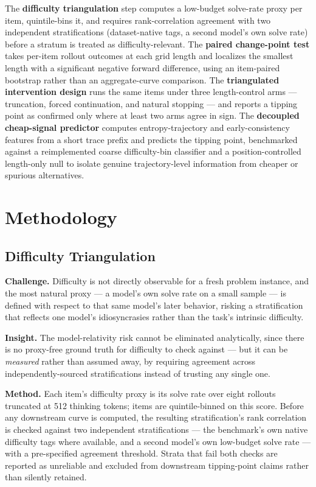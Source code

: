 \documentclass[11pt]{article}
\begin{document}
The \textbf{difficulty triangulation} step computes a low-budget solve-rate proxy per item, quintile-bins it, and requires rank-correlation agreement with two independent stratifications (dataset-native tags, a second model's own solve rate) before a stratum is treated as difficulty-relevant. The \textbf{paired change-point test} takes per-item rollout outcomes at each grid length and localizes the smallest length with a significant negative forward difference, using an item-paired bootstrap rather than an aggregate-curve comparison. The \textbf{triangulated intervention design} runs the same items under three length-control arms --- truncation, forced continuation, and natural stopping --- and reports a tipping point as confirmed only where at least two arms agree in sign. The \textbf{decoupled cheap-signal predictor} computes entropy-trajectory and early-consistency features from a short trace prefix and predicts the tipping point, benchmarked against a reimplemented coarse difficulty-bin classifier and a position-controlled length-only null to isolate genuine trajectory-level information from cheaper or spurious alternatives.

\section{Methodology}

\subsection{Difficulty Triangulation}
\textbf{Challenge.} Difficulty is not directly observable for a fresh problem instance, and the most natural proxy --- a model's own solve rate on a small sample --- is defined with respect to that same model's later behavior, risking a stratification that reflects one model's idiosyncrasies rather than the task's intrinsic difficulty.

\textbf{Insight.} The model-relativity risk cannot be eliminated analytically, since there is no proxy-free ground truth for difficulty to check against --- but it can be \emph{measured} rather than assumed away, by requiring agreement across independently-sourced stratifications instead of trusting any single one.

\textbf{Method.} Each item's difficulty proxy is its solve rate over eight rollouts truncated at 512 thinking tokens; items are quintile-binned on this score. Before any downstream curve is computed, the resulting stratification's rank correlation is checked against two independent stratifications --- the benchmark's own native difficulty tags where available, and a second model's own low-budget solve rate --- with a pre-specified agreement threshold. Strata that fail both checks are reported as unreliable and excluded from downstream tipping-point claims rather than silently retained.
\end{document}
